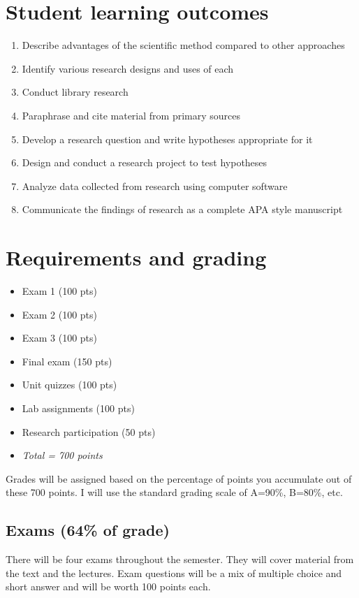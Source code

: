 \documentclass[10pt]{article}
\begin{document}
\section*{Student learning outcomes}
\label{sec:org9545f59}

\begin{enumerate}
\item Describe advantages of the scientific method compared to other approaches
\item Identify various research designs and uses of each
\item Conduct library research
\item Paraphrase and cite material from primary sources
\item Develop a research question and write hypotheses appropriate for it
\item Design and conduct a research project to test hypotheses
\item Analyze data collected from research using computer software
\item Communicate the findings of research as a complete APA style manuscript
\end{enumerate}

\section*{Requirements and grading}
\label{sec:org28e115c}

\begin{itemize}
\item Exam 1 (100 pts)
\item Exam 2 (100 pts)
\item Exam 3 (100 pts)
\item Final exam (150 pts)
\item Unit quizzes (100 pts)
\item Lab assignments (100 pts)
\item Research participation (50 pts)
\item \emph{Total = 700 points}
\end{itemize}

Grades will be assigned based on the percentage of points you accumulate out of these 700 points.  I will use the standard grading scale of A=90\%, B=80\%, etc.

\subsection*{Exams (64\% of grade)}
\label{sec:orgb9e80aa}
There will be four exams throughout the semester.  They will cover material from the text and the lectures.  Exam questions will be a mix of multiple choice and short answer and will be worth 100 points each.
\end{document}
